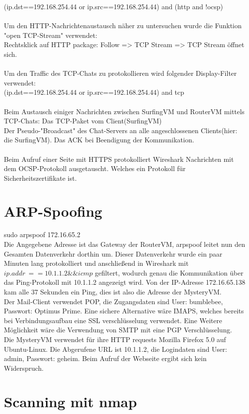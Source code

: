 \documentclass[12pt]{article}
\theoremstyle{plain}
\begin{document}
(ip.dst==192.168.254.44 or ip.src==192.168.254.44) and (http and !ocsp)\\ \\
Um den HTTP-Nachrichtenaustausch näher zu untersuchen wurde die Funktion "open TCP-Stream" verwendet: \\
Rechtsklick auf HTTP package: Follow => TCP Stream => TCP Stream öffnet sich.
\\\\
Um den Traffic des TCP-Chats zu protokollieren wird folgender Display-Filter verwendet: \\
(ip.dst==192.168.254.44 or ip.src==192.168.254.44) and tcp\\\\
Beim Austausch einiger Nachrichten zwischen SurfingVM und RouterVM mittels TCP-Chats:
Das TCP-Paket vom Client(SurfingVM)\\
Der Pseudo-"Broadcast" des Chat-Servers an alle angeschlossenen Clients(hier: die SurfingVM).
Das ACK bei Beendigung der Kommunikation.
\\\\
Beim Aufruf einer Seite mit HTTPS protokolliert Wireshark Nachrichten mit dem OCSP-Protokoll ausgetauscht. Welches ein Protokoll für Sicherheitszertifikate ist.
\section{ARP-Spoofing}
sudo arpspoof 172.16.65.2\\
Die Angegebene Adresse ist das Gateway der RouterVM, arpspoof leitet nun den Gesamten Datenverkehr dorthin um.
Dieser Datenverkehr wurde ein paar Minuten lang protokolliert und anschließend in Wireshark mit $ip.addr\ == 10.1.1.2 \&\& icmp$ gefiltert, wodurch genau die Kommunikation über das Ping-Protokoll mit 10.1.1.2 angezeigt wird. Von der IP-Adresse 172.16.65.138 kam alle 37 Sekunden ein Ping, dies ist also die Adresse der MysteryVM.\\
Der Mail-Client verwendet POP, die Zugangsdaten sind User: bumblebee, Passwort: Optimus Prime. Eine sichere Alternative wäre IMAPS, welches bereits bei Verbindungsaufbau eine SSL verschlüsselung verwendet. Eine Weitere Möglichkeit wäre die Verwendung von SMTP mit eine PGP Verschlüsselung.\\
Die MysteryVM verwendet für ihre HTTP requests Mozilla Firefox 5.0 auf Ubuntu-Linux. Die Abgerufene URL ist 10.1.1.2, die Logindaten sind User: admin, Passwort: geheim. Beim Aufruf der Webseite ergibt sich kein Widerspruch.
\section{Scanning mit nmap}
\end{document}
